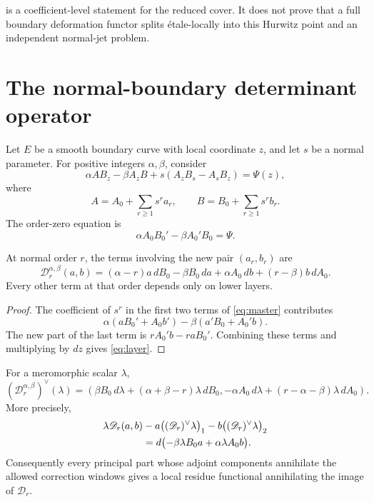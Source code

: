 \documentclass[11pt,reqno]{amsart}
\begin{document}
\begin{remark}
 is a coefficient-level statement for the reduced
cover.  It does not prove that a full boundary deformation functor splits
étale-locally into this Hurwitz point and an independent normal-jet problem.
\end{remark}

\section{The normal-boundary determinant operator}
\label{sec:normal-complex}

Let \(E\) be a smooth boundary curve with local coordinate \(z\), and let
\(s\) be a normal parameter.  For positive integers \(\alpha,\beta\),
consider
\begin{equation}
\label{eq:master}
\alpha AB_z-\beta A_zB
+s(A_zB_s-A_sB_z)=\Psi(z),
\end{equation}
where
\[
A=A_0+\sum_{r\ge1}s^ra_r,\qquad
B=B_0+\sum_{r\ge1}s^rb_r.
\]
The order-zero equation is
\[
\alpha A_0B_0'-\beta A_0'B_0=\Psi.
\]

\begin{proposition}
\label{prop:layer}
At normal order \(r\), the terms involving the new pair
\((a_r,b_r)\) are
\begin{equation}
\label{eq:layer}
\boxed{
\mathscr D_r^{\alpha,\beta}(a,b)
=(\alpha-r)a\,dB_0-\beta B_0\,da
+\alpha A_0\,db+(r-\beta)b\,dA_0.}
\end{equation}
Every other term at that order depends only on lower layers.
\end{proposition}

\begin{proof}
The coefficient of \(s^r\) in the first two terms of
\eqref{eq:master} contributes
\[
\alpha(aB_0'+A_0b')-\beta(a'B_0+A_0'b).
\]
The new part of the last term is \(rA_0'b-raB_0'\).  Combining these
terms and multiplying by \(dz\) gives \eqref{eq:layer}.
\end{proof}

\begin{proposition}
\label{prop:adjoint}
For a meromorphic scalar \(\lambda\),
\begin{equation}
\label{eq:adjoint}
\boxed{
(\mathscr D_r^{\alpha,\beta})^\vee(\lambda)
=\left(
\beta B_0\,d\lambda+(\alpha+\beta-r)\lambda\,dB_0,
-\alpha A_0\,d\lambda+(r-\alpha-\beta)\lambda\,dA_0
\right).}
\end{equation}
More precisely,
\begin{align}
\lambda\mathscr D_r(a,b)
&-a\bigl((\mathscr D_r)^\vee\lambda\bigr)_1
-b\bigl((\mathscr D_r)^\vee\lambda\bigr)_2\notag\\
&=d\bigl(-\beta\lambda B_0a+\alpha\lambda A_0b\bigr).
\label{eq:ibp}
\end{align}
Consequently every principal part whose adjoint components annihilate the
allowed correction windows gives a local residue functional annihilating the
image of \(\mathscr D_r\).
\end{proposition}
\end{document}
